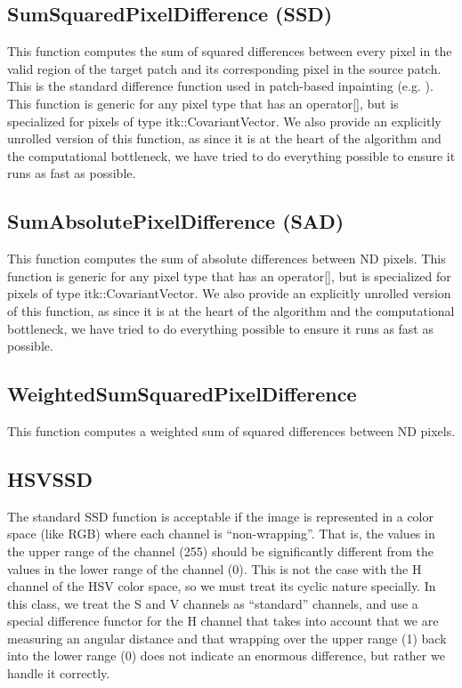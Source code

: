 \documentclass{InsightArticle}
\begin{document}
\subsection{SumSquaredPixelDifference (SSD)}
This function computes the sum of squared differences between every pixel in the valid region of the target patch and its corresponding pixel in the source patch. This is the standard difference function used in patch-based inpainting (e.g. \cite{criminisi}). This function is generic for any pixel type that has an operator[], but is specialized for pixels of type itk::CovariantVector. We also provide an explicitly unrolled version of this function, as since it is at the heart of the algorithm and the computational bottleneck, we have tried to do everything possible to ensure it runs as fast as possible.

\subsection{SumAbsolutePixelDifference (SAD)}
This function computes the sum of absolute differences between ND pixels. This function is generic for any pixel type that has an operator[], but is specialized for pixels of type itk::CovariantVector. We also provide an explicitly unrolled version of this function, as since it is at the heart of the algorithm and the computational bottleneck, we have tried to do everything possible to ensure it runs as fast as possible.

\subsection{WeightedSumSquaredPixelDifference}
This function computes a weighted sum of squared differences between ND pixels.

\subsection{HSVSSD}
The standard SSD function is acceptable if the image is represented in a color space (like RGB) where each channel is ``non-wrapping''. That is, the values in the upper range of the channel (255) should be significantly different from the values in the lower range of the channel (0). This is not the case with the H channel of the HSV color space, so we must treat its cyclic nature specially. In this class, we treat the S and V channels as ``standard'' channels, and use a special difference functor for the H channel that takes into account that we are measuring an angular distance and that wrapping over the upper range (1) back into the lower range (0) does not indicate an enormous difference, but rather we handle it correctly.
\end{document}
